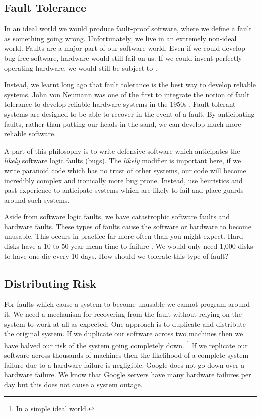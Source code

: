 \subsection{Fault Tolerance}
In an ideal world we would produce fault-proof software,
where we define a fault as something going wrong.
Unfortunately, we live in an extremely non-ideal world.
Faults are a major part of our software world.
Even if we could develop bug-free software,
hardware would still fail on us.
If we could invent perfectly operating hardware,
we would still be subject to .

Instead, we learnt long ago that fault tolerance is the best way to develop reliable systems.
John von Neumann was one of the first to integrate the notion of fault tolerance to develop reliable hardware systems in the 1950s \cite{neumann-faults}.
Fault tolerant systems are designed to be able to recover in the event of a fault.
By anticipating faults, rather than putting our heads in the sand,
we can develop much more reliable software.

A part of this philosophy is to write defensive software which anticipates the \textsl{likely} software logic faults (bugs).
The \textsl{likely} modifier is important here,
if we write paranoid code which has no trust of other systems,
our code will become incredibly complex and ironically more bug prone.
Instead, use heuristics and past experience to anticipate systems which are likely to fail and place guards around such systems.

Aside from software logic faults,
we have catastrophic software faults and hardware faults.
These types of faults cause the software or hardware to become unusable.
This occurs in practice far more often than you might expect.
Hard disks have a 10 to 50 year mean time to failure \cite{data-intensive}.
We would only need 1,000 disks to have one die every 10 days.
How should we tolerate this type of fault?

\subsection{Distributing Risk}
For faults which cause a system to become unusable we cannot program around it.
We need a mechanism for recovering from the fault without relying on the system to work at all as expected.
One approach is to duplicate and distribute the original system.
If we duplicate our software across two machines then we have halved our risk of the system going completely down.%
\footnote{In a simple ideal world.}
If we replicate our software across thousands of machines then the likelihood of a complete system failure due to a hardware failure is negligible.
Google does not go down over a hardware failure.
We know that Google servers have many hardware failures per day but this does not cause a system outage.


